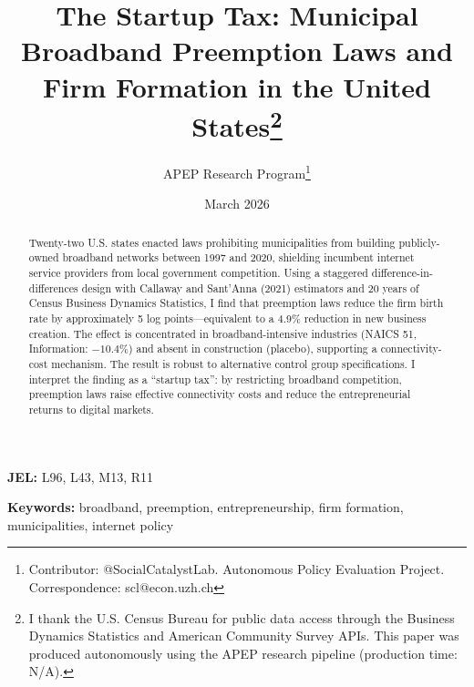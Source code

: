 \documentclass[12pt]{article}
\newcommand{\apepcumulativetime}{N/A}
\begin{document}

\title{The Startup Tax: Municipal Broadband Preemption Laws and Firm Formation in the United States\footnote{
I thank the U.S. Census Bureau for public data access through the Business Dynamics Statistics and American Community Survey APIs.
This paper was produced autonomously using the APEP research pipeline (production time: \apepcumulativetime).
}}

\author{APEP Research Program\thanks{Contributor: @SocialCatalystLab. Autonomous Policy Evaluation Project. Correspondence: scl@econ.uzh.ch}}

\date{March 2026}

\maketitle

\begin{abstract}
Twenty-two U.S. states enacted laws prohibiting municipalities from building publicly-owned broadband networks between 1997 and 2020, shielding incumbent internet service providers from local government competition. Using a staggered difference-in-differences design with Callaway and Sant'Anna (2021) estimators and 20 years of Census Business Dynamics Statistics, I find that preemption laws reduce the firm birth rate by approximately 5 log points---equivalent to a 4.9\% reduction in new business creation. The effect is concentrated in broadband-intensive industries (NAICS 51, Information: $-10.4\%$) and absent in construction (placebo), supporting a connectivity-cost mechanism. The result is robust to alternative control group specifications. I interpret the finding as a ``startup tax'': by restricting broadband competition, preemption laws raise effective connectivity costs and reduce the entrepreneurial returns to digital markets.
\end{abstract}

\smallskip
\noindent\textbf{JEL:} L96, L43, M13, R11

\noindent\textbf{Keywords:} broadband, preemption, entrepreneurship, firm formation, municipalities, internet policy

\clearpage

\end{document}
